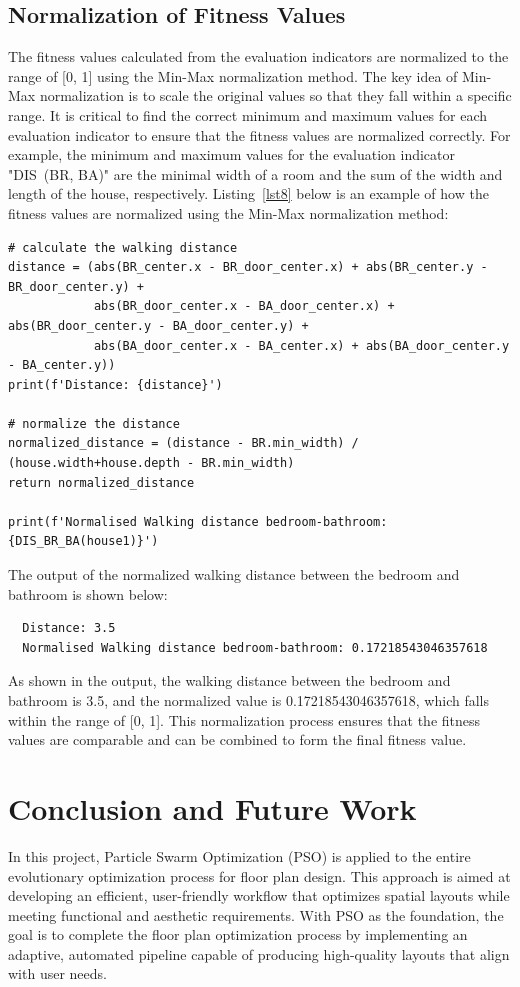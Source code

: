 \documentclass[]{article}
\begin{document}
\subsection{Normalization of Fitness Values}
The fitness values calculated from the evaluation indicators are normalized to the range of [0, 1] using the Min-Max normalization method. The key idea of Min-Max normalization is to scale the original values so that they fall within a specific range. It is critical to find the correct minimum and maximum values for each evaluation indicator to ensure that the fitness values are normalized correctly. For example, the minimum and maximum values for the evaluation indicator "DIS~(BR, BA)" are the minimal width of a room and the sum of the width and length of the house, respectively. Listing~\ref{lst8} below is an example of how the fitness values are normalized using the Min-Max normalization method:
\begin{lstlisting}[caption=Normalization of fitness values, label=lst8]
# calculate the walking distance
distance = (abs(BR_center.x - BR_door_center.x) + abs(BR_center.y - BR_door_center.y) +
            abs(BR_door_center.x - BA_door_center.x) + abs(BR_door_center.y - BA_door_center.y) +
            abs(BA_door_center.x - BA_center.x) + abs(BA_door_center.y - BA_center.y))
print(f'Distance: {distance}')

# normalize the distance
normalized_distance = (distance - BR.min_width) / (house.width+house.depth - BR.min_width)
return normalized_distance

print(f'Normalised Walking distance bedroom-bathroom: {DIS_BR_BA(house1)}')
\end{lstlisting}
The output of the normalized walking distance between the bedroom and bathroom is shown below:
\begin{lstlisting}
  Distance: 3.5
  Normalised Walking distance bedroom-bathroom: 0.17218543046357618
\end{lstlisting}
As shown in the output, the walking distance between the bedroom and bathroom is 3.5, and the normalized value is 0.17218543046357618, which falls within the range of [0, 1]. This normalization process ensures that the fitness values are comparable and can be combined to form the final fitness value.

\section{Conclusion and Future Work}
In this project, Particle Swarm Optimization (PSO) is applied to the entire evolutionary optimization process for floor plan design. This approach is aimed at developing an efficient, user-friendly workflow that optimizes spatial layouts while meeting functional and aesthetic requirements. With PSO as the foundation, the goal is to complete the floor plan optimization process by implementing an adaptive, automated pipeline capable of producing high-quality layouts that align with user needs.
\end{document}
